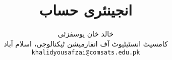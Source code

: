 \documentclass[leqno,b5paper]{book}
\author{
خالد خان یوسفزئی\\
{\small {کامسیٹ انسٹیٹیوٹ آف انفارمیشن ٹیکنالوجی، اسلام آباد}}\\
\texttt{khalidyousafzai@comsats.edu.pk}
}
\title{انجینئری حساب}
\date{}                           %
\begin{document}
\begin{urdufont}


\renewcommand*{\contentsname}{عنوان}    %
\renewcommand*{\proofname}{ثبوت}   %
\renewcommand*{\appendixname}{ضمیمہ}


\frontmatter                          %

\maketitle

\tableofcontents
\pagestyle{empty}
\newpage

\newpage

%


\mainmatter                      %
\renewcommand*{\chaptername}{باب}

\pagestyle{headings}









\appendix



%
%
%
\backmatter

\cleardoublepage
%
%

\renewcommand*{\indexname}{فرہنگ}      %
\cleardoublepage
{}
\printindex


\end{urdufont}
\end{document}
